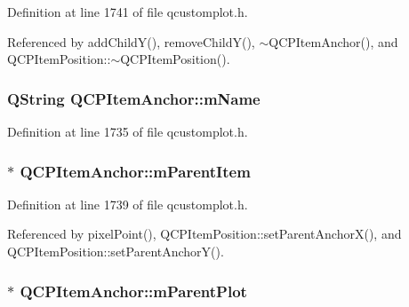Definition at line 1741 of file qcustomplot.\+h.



Referenced by add\+Child\+Y(), remove\+Child\+Y(), $\sim$\+Q\+C\+P\+Item\+Anchor(), and Q\+C\+P\+Item\+Position\+::$\sim$\+Q\+C\+P\+Item\+Position().

\hypertarget{class_q_c_p_item_anchor_a23ad4d0ab0d2cbb41a7baf05bcf996ec}{}
\subsubsection[{m\+Name}]{\setlength{\rightskip}{0pt plus 5cm}Q\+String Q\+C\+P\+Item\+Anchor\+::m\+Name\hspace{0.3cm}{\ttfamily [protected]}}\label{class_q_c_p_item_anchor_a23ad4d0ab0d2cbb41a7baf05bcf996ec}


Definition at line 1735 of file qcustomplot.\+h.

\hypertarget{class_q_c_p_item_anchor_a80fad480ad3bb980446ed6ebc00818ae}{}
\subsubsection[{m\+Parent\+Item}]{$\ast$ Q\+C\+P\+Item\+Anchor\+::m\+Parent\+Item\hspace{0.3cm}{\ttfamily [protected]}}\label{class_q_c_p_item_anchor_a80fad480ad3bb980446ed6ebc00818ae}


Definition at line 1739 of file qcustomplot.\+h.



Referenced by pixel\+Point(), Q\+C\+P\+Item\+Position\+::set\+Parent\+Anchor\+X(), and Q\+C\+P\+Item\+Position\+::set\+Parent\+Anchor\+Y().

\hypertarget{class_q_c_p_item_anchor_a59b968410831ba91a25cc75a77dde6f5}{}
\subsubsection[{m\+Parent\+Plot}]{$\ast$ Q\+C\+P\+Item\+Anchor\+::m\+Parent\+Plot\hspace{0.3cm}{\ttfamily [protected]}}\label{class_q_c_p_item_anchor_a59b968410831ba91a25cc75a77dde6f5}


